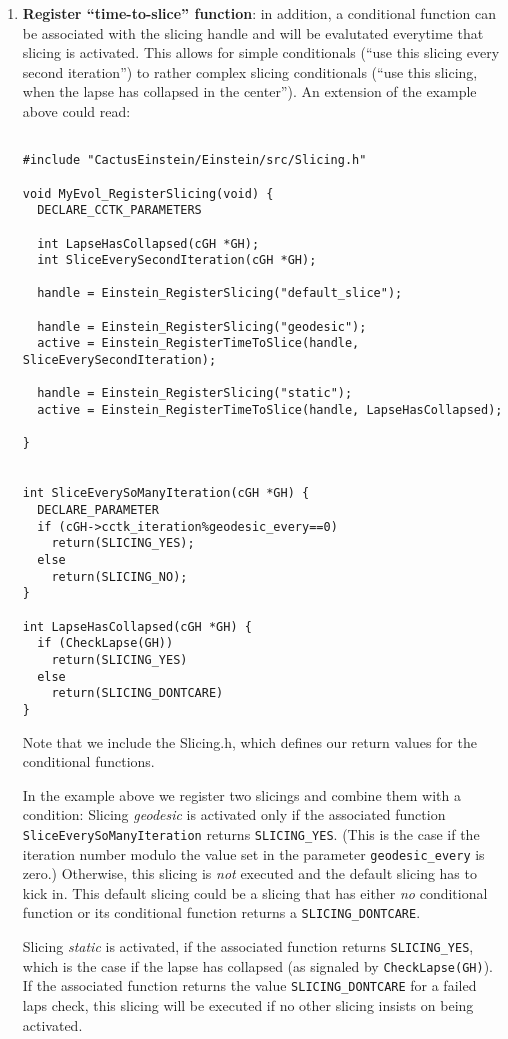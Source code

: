 \documentclass{article}
\begin{document}
\begin{enumerate}
\item{\bf Register ``time-to-slice'' function}: in addition, a
conditional function can be associated with the slicing handle and 
will be evalutated everytime that slicing is activated. This allows
for simple conditionals (``use this slicing every second iteration'')
to rather complex slicing conditionals (``use this slicing, when the
lapse has collapsed in the center''). An extension of the example
above could read:
\begin{verbatim}
 
#include "CactusEinstein/Einstein/src/Slicing.h"

void MyEvol_RegisterSlicing(void) {
  DECLARE_CCTK_PARAMETERS

  int LapseHasCollapsed(cGH *GH);
  int SliceEverySecondIteration(cGH *GH);

  handle = Einstein_RegisterSlicing("default_slice");

  handle = Einstein_RegisterSlicing("geodesic");
  active = Einstein_RegisterTimeToSlice(handle, SliceEverySecondIteration);	

  handle = Einstein_RegisterSlicing("static");
  active = Einstein_RegisterTimeToSlice(handle, LapseHasCollapsed);	

}


int SliceEverySoManyIteration(cGH *GH) {
  DECLARE_PARAMETER
  if (cGH->cctk_iteration%geodesic_every==0) 
    return(SLICING_YES);
  else 
    return(SLICING_NO);
}

int LapseHasCollapsed(cGH *GH) {
  if (CheckLapse(GH)) 
    return(SLICING_YES)
  else
    return(SLICING_DONTCARE)
}

\end{verbatim}
Note that we include the Slicing.h, which defines our return values
for the conditional functions. 

In the example above we register two
slicings and combine them with a condition:
Slicing {\em geodesic} is activated only if the associated function
{\tt SliceEverySoManyIteration} returns {\tt SLICING\_YES}. (This is
the case if the iteration number modulo the value set in the parameter 
{\tt geodesic\_every} is zero.)
Otherwise, this slicing is {\em not} executed and the default slicing
has to kick in. This default slicing could 
be a slicing that has either {\em no} conditional function or its
conditional function returns a {\tt SLICING\_DONTCARE}.

Slicing {\em static} is activated, if the associated function returns
{\tt SLICING\_YES}, which is the case if the lapse has collapsed 
(as signaled by {\tt CheckLapse(GH)}). If the associated function returns
the value {\tt SLICING\_DONTCARE} for a failed laps check,
this slicing will be executed if no other slicing insists on being
activated. 



\end{enumerate}
\end{document}
